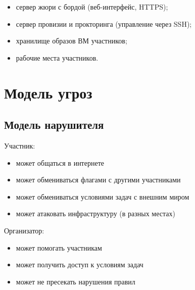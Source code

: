 \begin{itemize}
\item
  сервер жюри с бордой (веб-интерфейс, HTTPS);
\item
  сервер провизии и прокторинга (управление через SSH);
\item
  хранилище образов ВМ участников;
\item
  рабочие места участников.
\end{itemize}

\section{Модель угроз}

\subsection{Модель нарушителя}

Участник:
\begin{itemize}
\item
  может общаться в интернете
\item
  может обмениваться флагами с другими участниками
\item
  может обмениваться условиями задач с внешним миром
\item
  может атаковать инфраструктуру (в разных местах)
\end{itemize}

Организатор:
\begin{itemize}
\item может помогать участникам
\item может получить доступ к условиям задач
\item может не пресекать нарушения правил
\end{itemize}
